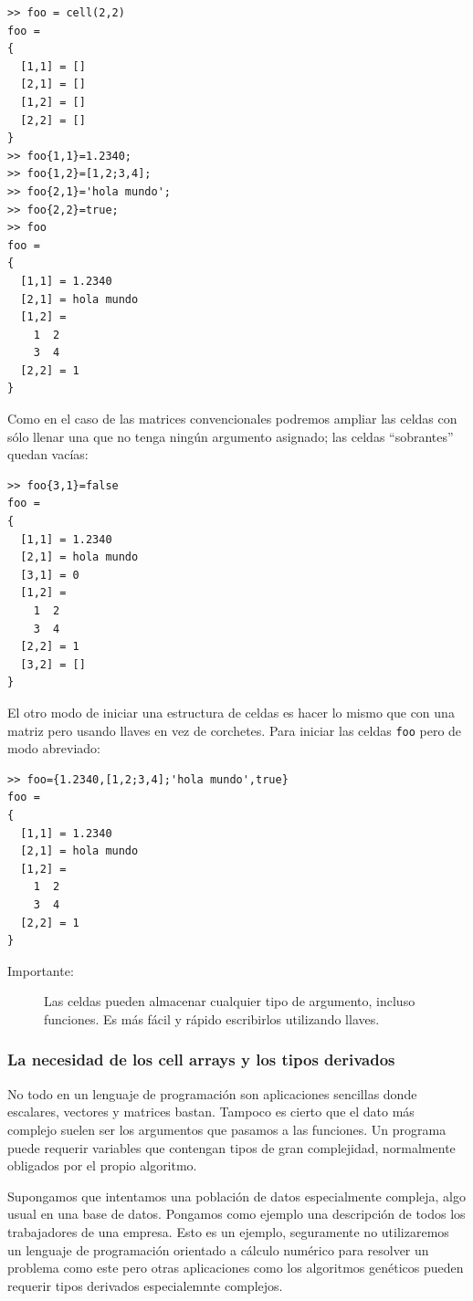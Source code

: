 \begin{verbatim}
>> foo = cell(2,2)
foo =
{
  [1,1] = []
  [2,1] = []
  [1,2] = []
  [2,2] = []
}
>> foo{1,1}=1.2340;
>> foo{1,2}=[1,2;3,4];
>> foo{2,1}='hola mundo';
>> foo{2,2}=true;
>> foo
foo =
{
  [1,1] = 1.2340
  [2,1] = hola mundo
  [1,2] =
    1  2
    3  4
  [2,2] = 1
}
\end{verbatim}
Como en el caso de las matrices convencionales podremos ampliar las
celdas con sólo llenar una que no tenga ningún argumento asignado; las
celdas {}``sobrantes'' quedan vacías:

\begin{verbatim}
>> foo{3,1}=false
foo =
{
  [1,1] = 1.2340
  [2,1] = hola mundo
  [3,1] = 0
  [1,2] =
    1  2
    3  4
  [2,2] = 1
  [3,2] = []
}
\end{verbatim}
El otro modo de iniciar una estructura de celdas es hacer lo mismo que
con una matriz pero usando llaves en vez de corchetes. Para iniciar
las celdas \texttt{foo} pero de modo abreviado:

\begin{verbatim}
>> foo={1.2340,[1,2;3,4];'hola mundo',true}
foo =
{
  [1,1] = 1.2340
  [2,1] = hola mundo
  [1,2] =
    1  2
    3  4
  [2,2] = 1
}
\end{verbatim}
\begin{description}
\item [Importante:]Las celdas pueden almacenar cualquier tipo de
  argumento, incluso funciones. Es más fácil y rápido escribirlos
  utilizando llaves.
\end{description}

\subsubsection{La necesidad de los cell arrays y los tipos derivados}
No todo en un lenguaje de programación son aplicaciones sencillas
donde escalares, vectores y matrices bastan.  Tampoco es cierto que
el dato más complejo suelen ser los argumentos que pasamos a las
funciones.  Un programa puede requerir variables que contengan tipos
de gran complejidad, normalmente obligados por el propio algoritmo.

Supongamos que intentamos una población de datos especialmente compleja,
algo usual en una base de datos.  Pongamos como ejemplo una descripción
de todos los trabajadores de una empresa.  Esto es un ejemplo, seguramente
no utilizaremos un lenguaje de programación orientado a cálculo numérico
para resolver un problema como este pero otras aplicaciones como los
algoritmos genéticos pueden requerir tipos derivados especialemnte complejos.

